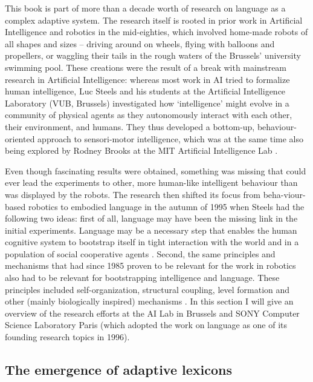 This book is part of more than a decade worth of research on language as a complex adaptive system. The research itself is rooted in prior work in Artificial Intelligence and robotics in the mid-eighties, which involved home-made robots of all shapes and sizes -- driving around on wheels, flying with balloons and propellers, or waggling their tails in the rough waters of the Brussels' university swimming pool. These creations were the result of a break with mainstream research in Artificial Intelligence: whereas most work in AI tried to formalize human intelligence, Luc Steels and his students at the Artificial Intelligence Laboratory (VUB, Brussels) investigated how `intelligence' might evolve in a community of physical agents as they autonomously interact with each other, their environment, and humans. They thus developed a bottom-up, behaviour-oriented approach to sensori-motor intelligence, which was at the same time also being explored by Rodney Brooks at the MIT Artificial Intelligence Lab \citep{steels95alife-route}.

Even though fascinating results were obtained, something was missing that could ever lead the experiments to other, more human-like intelligent behaviour than was displayed by the robots. The research then shifted its focus from beha-viour-based robotics to embodied language in the autumn of 1995 when Steels had the following two ideas: first of all, language may have been the missing link in the initial experiments. Language may be a necessary step that enables the human cognitive system to bootstrap itself in tight interaction with the world and in a population of social cooperative agents \citep{steels03intelligence}. Second, the same principles and mechanisms that had since 1985 proven to be relevant for the work in robotics also had to be relevant for bootstrapping intelligence and language. These principles included self-organization, structural coupling, level formation and other (mainly biologically inspired) mechanisms \citep{steels97synthesising}. In this section I will give an overview of the research efforts at the AI Lab in Brussels and SONY Computer Science Laboratory Paris (which adopted the work on language as one of its founding research topics in 1996).

\subsection{The emergence of adaptive lexicons}
\label{s:history-lex}

